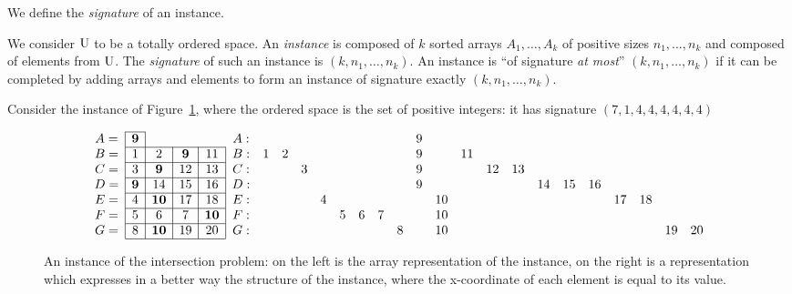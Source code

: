 We define  the {\em signature} of an instance.
%
\begin{definition}
We consider $\rm U$ to be a totally ordered space.
%
An {\em instance} is composed of $k$ sorted arrays $A_1,\ldots,A_k$ of
positive sizes $n_1,\ldots, n_k$ and composed of elements from
$\rm{U}$.
%
The {\em signature} of such an instance is $(k,n_1,\ldots,n_k)$.
%
An instance is ``of signature {\em at most}'' $(k,n_1,\ldots,n_k)$ if it
can be completed by adding arrays and elements to form an instance of
signature exactly $(k,n_1,\ldots,n_k)$.
\end{definition}
%
\begin{example}
Consider the instance of Figure~\ref{fig:instanceOne}, where the
ordered space is the set of positive integers: it has signature
$(7,1,4,4,4,4,4,4)$
%
\begin{figure}
$$
\begin{array}{c|c|c|c|c|c|c|c|c|c|c|c|c|c|c|c|c|c|c|c|c|c|c|c|c|c}\cline{2-2}
A=& \bf 9\\ \cline{2-5}
B=& 1& 2&\bf  9&11\\ \cline{2-5}
C=& 3&\bf  9&12&13\\ \cline{2-5}
D=&\bf  9&14&15&16\\ \cline{2-5}
E=& 4&\bf 10&17&18\\ \cline{2-5}
F=& 5& 6& 7&\bf 10\\ \cline{2-5}
G=& 8&\bf 10&19&20\\ \cline{2-5}
\end{array}
\hfill
\begin{array}{cccccccccccccccccccccccccc}
A:&  &  &  &  &  &  &  &  & 9&  &  &  &  &  &  &  &  &  &  &  \\
B:& 1& 2&  &  &  &  &  &  & 9&  &11&  &  &  &  &  &  &  &  &  \\
C:&  &  & 3&  &  &  &  &  & 9&  &  &12&13&  &  &  &  &  &  &  \\
D:&  &  &  &  &  &  &  &  & 9&  &  &  &  &14&15&16&  &  &  &  \\
E:&  &  &  & 4&  &  &  &  &  &10&  &  &  &  &  &  &17&18&  &  \\
F:&  &  &  &  & 5& 6& 7&  &  &10&  &  &  &  &  &  &  &  &  &  \\
G:&  &  &  &  &  &  &  & 8&  &10&  &  &  &  &  &  &  &  &19&20\\
\end{array}
$$ 
\caption{An instance of the intersection problem: on the left is the
array representation of the instance, on the right is a representation
which expresses in a better way the structure of the instance, where
the x-coordinate of each element is equal to its
value.}\label{fig:instanceOne}
\end{figure}
\end{example}
%

